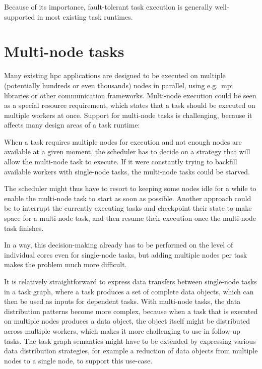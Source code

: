 Because of its importance, fault-tolerant task execution is generally well-supported in most
existing task runtimes.

\section{Multi-node tasks}
Many existing \gls{hpc} applications are designed to be executed on multiple
(potentially hundreds or even thousands) nodes in parallel, using e.g.\ \gls{mpi}
libraries or other communication frameworks. Multi-node execution could be seen as a special
resource requirement, which states that a task should be executed on multiple workers at once.
Support for multi-node tasks is challenging, because it affects many design areas of a task
runtime:
\begin{description}[wide=0pt]
	\item[Scheduling] When a task requires multiple nodes for execution and not enough nodes are available at a given
		moment, the scheduler has to decide on a strategy that will allow the multi-node task to execute.
		If it were constantly trying to backfill available workers with single-node tasks, the multi-node
		tasks could be starved.

		The scheduler might thus have to resort to keeping some nodes idle for a while to enable the
		multi-node task to start as soon as possible. Another approach could be to interrupt the currently
		executing tasks and checkpoint their state to make space for a multi-node task, and then resume
		their execution once the multi-node task finishes.

		In a way, this decision-making already has to be performed on the level of individual cores even
		for single-node tasks, but adding multiple nodes per task makes the problem much more difficult.
	\item[Data transfers] It is relatively straightforward to express data transfers between single-node tasks in a task
		graph, where a task produces a set of complete data objects, which can then be used as inputs for
		dependent tasks. With multi-node tasks, the data distribution patterns become more complex, because
		when a task that is executed on multiple nodes produces a data object, the object itself might be
		distributed across multiple workers, which makes it more challenging to use in follow-up tasks. The
		task graph semantics might have to be extended by expressing various data distribution strategies,
		for example a reduction of data objects from multiple nodes to a single node, to support this
		use-case.


\end{description}
